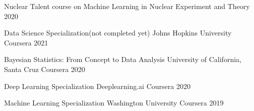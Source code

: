 

\begin{cvhonors}

            \cvhonor
            {Nuclear Talent course on Machine Learning in Nuclear Experiment and Theory} %
        {} %
    {} %
    {2020} %
    
                \cvhonor
            {Data Science Specialization(not completed yet)} %
        {Johns Hopkins University Coursera} %
    {} %
    {2021} %
    
            \cvhonor
            {Bayesian Statistics: From Concept to Data Analysis} %
        {University of California, Santa Cruz Coursera} %
    {} %
    {2020} %


            \cvhonor
        {Deep Learning Specialization} %
        {Deeplearning.ai Coursera} %
    {} %
    {2020} %
%     
    
     \cvhonor
        {Machine Learning Specialization} %
  {Washington University Coursera} %
    {} %
    {2019} %
  

\end{cvhonors}
